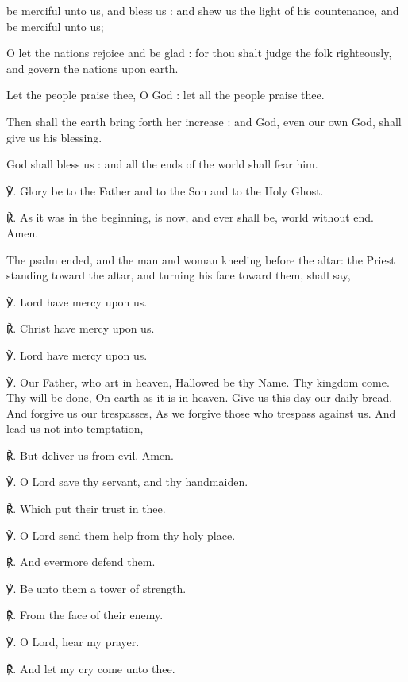  be merciful unto us, and bless us : and shew us the light of his countenance, and be merciful unto us;\par
{}
O let the nations rejoice and be glad : for thou shalt judge the folk righteously, and govern the nations upon earth.\par
{}Let the people praise thee, O God : let all the people praise thee.\par
{}Then shall the earth bring forth her increase : and God, even our own God, shall give us his blessing.\par
{}God shall bless us : and all the ends of the world shall fear him.\par
    ℣. Glory be to the Father and to the Son and to the Holy Ghost.\par
    ℟. As it was in the beginning, is now, and ever shall be, world without end. Amen.
\begin{rubric}
	The psalm ended, and the man and woman kneeling before the altar: the Priest standing toward the altar, and turning his face toward them, shall say,
\end{rubric}
℣. Lord have mercy upon us.\par
℟. Christ have mercy upon us.\par
℣. Lord have mercy upon us.\par
℣. Our Father, who art in heaven, Hallowed be thy Name. Thy kingdom come. Thy will be done, On earth as it is in heaven. Give us this day our daily bread. And forgive us our trespasses, As we forgive those who trespass against us. And lead us not into temptation,\par
℟. But deliver us from evil. Amen.\par
℣. O Lord save thy servant, and thy handmaiden.\par
℟. Which put their trust in thee.\par
℣. O Lord send them help from thy holy place.\par
℟. And evermore defend them.\par
℣. Be unto them a tower of strength.\par
℟. From the face of their enemy.\par
℣. O Lord, hear my prayer.\par
℟. And let my cry come unto thee.\par
